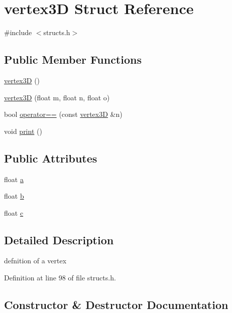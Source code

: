 \hypertarget{structvertex3_d}{}\section{vertex3D Struct Reference}
\label{structvertex3_d}


{\ttfamily \#include $<$structs.\+h$>$}

\subsection*{Public Member Functions}
\begin{DoxyCompactItemize}
\item 
\mbox{\hyperlink{structvertex3_d_aa0e581f41a080aa627bb6b6a2bc27a95}{vertex3D}} ()
\item 
\mbox{\hyperlink{structvertex3_d_a658774125592959b6717ce0d5ae53da4}{vertex3D}} (float m, float n, float o)
\item 
bool \mbox{\hyperlink{structvertex3_d_ad446425337dbe1646f4fa91ca6975818}{operator==}} (const \mbox{\hyperlink{structvertex3_d}{vertex3D}} \&n)
\item 
void \mbox{\hyperlink{structvertex3_d_aef60c9e545fe7ee4b2fa0a51d34948d4}{print}} ()
\end{DoxyCompactItemize}
\subsection*{Public Attributes}
\begin{DoxyCompactItemize}
\item 
float \mbox{\hyperlink{structvertex3_d_a40127b37210f1330f6211c904a5200a9}{a}}
\item 
float \mbox{\hyperlink{structvertex3_d_a5464fcdf103f44a0276a16227f9ba76c}{b}}
\item 
float \mbox{\hyperlink{structvertex3_d_af706a01fa9e30bbd5e05b36ec2c42274}{c}}
\end{DoxyCompactItemize}


\subsection{Detailed Description}
defnition of a vertex 

Definition at line 98 of file structs.\+h.



\subsection{Constructor \& Destructor Documentation}
\mbox{\label{structvertex3_d_aa0e581f41a080aa627bb6b6a2bc27a95}} 
